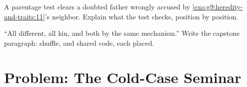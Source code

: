 \begin{exercise}[$\star\star$]\label{exo:g9:unique-individuals:11}
A parentage test clears a doubted father wrongly accused
by \cref{exo:g9:heredity-and-traits:11}'s neighbor.
Explain what the test checks, position by position.
\end{exercise}

\begin{exercise}[$\star\star\star$]\label{exo:g9:unique-individuals:12}
``All different, all kin, and both by the same
mechanism.'' Write the capstone paragraph: shuffle,
 and shared code, each placed.
\end{exercise}

\section{Problem: The Cold-Case Seminar}


